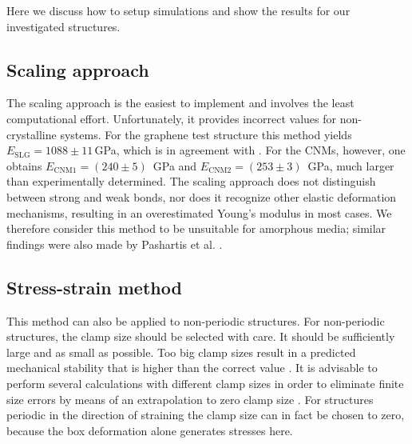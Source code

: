 \documentclass[preprint,12pt]{elsarticle}
\begin{document}
Here we discuss how to setup simulations and show the results for our investigated structures.


\subsection{Scaling approach}

The scaling approach is the easiest to implement and involves the least computational effort. 
Unfortunately, it provides incorrect values for non-crystalline systems. 
For the graphene test structure this method yields $E_{\text{SLG}}=1088 \pm 11$\,GPa, 
which is in agreement with \cite{GEH:PE18}. 
For the CNMs, however, one obtains $E_{\text{CNM1}}=(240 \pm 5)$~GPa and 
$E_{\text{CNM2}}=(253 \pm 3)$~GPa, 
much larger than experimentally determined.
The scaling approach does not distinguish between strong and weak bonds, 
nor does it recognize other elastic deformation mechanisms, resulting in an overestimated 
Young's modulus in most cases. We therefore consider this method to be unsuitable 
for amorphous media; similar findings were also made by Pashartis et al. \cite{PSH:CMS24}.

\subsection{Stress-strain method}
\label{sec-3-2} 

This method can also be applied to non-periodic structures. 
For non-periodic structures, the clamp size should be selected with care. 
It should be sufficiently large and as small as possible.
Too big clamp sizes result in a predicted mechanical stability that is higher 
than the correct value \cite{Mihlan:B21}. It is advisable to perform
several calculations with different clamp sizes in order to eliminate 
finite size errors by means of an extrapolation to zero clamp size \cite{Mihlan:B21}. 
For structures periodic in the direction of straining the clamp size 
can in fact be chosen to zero, because the box deformation alone generates stresses here.
\end{document}
